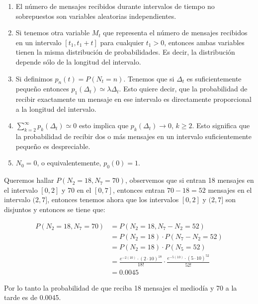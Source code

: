 \documentclass[11pt]{article}
\begin{document}
\begin{enumerate}
  \item El número de mensajes recibidos durante intervalos de tiempo
        no sobrepuestos son variables aleatorias independientes.
  \item Si tenemos otra variable $ M_t $ que representa el número de 
        mensajes recibidos en un intervalo $[t_1, t_1 + t]$ para cualquier
        $ t_1 > 0 $, entonces ambas variables tienen la misma distribución de
        probabilidades. Es decir, la distribución depende sólo de la longitud
        del intervalo.
  \item Si definimos $p_n(t) = P(N_t = n)$. Tenemos que si $\Delta_t$
        es suficientemente pequeño entonces $p_1(\Delta_t) \simeq \lambda \Delta_t$. 
        Esto quiere decir, que la probabilidad de recibir exactamente un mensaje en
        ese intervalo es directamente proporcional a la longitud del intervalo.
  \item $\displaystyle\sum_{k = 2}^{\infty} p_k(\Delta_t) \simeq 0 $ esto 
        implica que $ p_k(\Delta_t) \rightarrow 0 $, $k \geq 2$.
        Esto significa que la probabilidad de recibir dos o más
        mensajes en un intervalo suficientemente pequeño es despreciable.
  \item $ N_0 = 0 $, o equivalentemente, $ p_0(0) = 1 $.
\end{enumerate}

Queremos hallar $ P(N_2 = 18, N_7 = 70) $, observemos que si entran 18 mensajes en
el intervalo $[0, 2]$ y 70 en el $[0, 7]$, entonces entran $70 - 18 = 52$ mensajes en
el intervalo $(2, 7]$, entonces tenemos ahora que los intervalos $[0, 2] $ y $ (2, 7] $
son disjuntos y entonces se tiene que:

\begin{align*}
  P(N_2 = 18, N_7 = 70) &= P(N_2 = 18, N_7 - N_2 = 52) \\
                        &= P(N_2 = 18) \cdot P(N_7 - N_2 = 52) \\
                        &= P(N_2 = 18) \cdot P(N_5 = 52) \\
                        &= \frac{e^{-2(10)} \cdot (2 \cdot 10)^{18}}{18!} \cdot \frac{e^{-5(10)} \cdot (5 \cdot 10)^{52}}{52!} \\
                        &= 0.0045
\end{align*}

Por lo tanto la probabilidad de que reciba 18 mensajes el mediodía y 70 a la tarde es de 0.0045.
\end{document}
